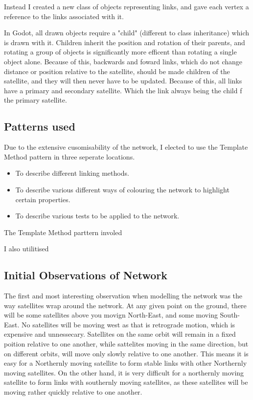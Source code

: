 \documentclass[12pt]{article}
\begin{document}
Instead I created a new class of objects representing links, and gave each vertex a reference to the links associated with it. 

In Godot, all drawn objects require a "child" (different to class inheritance) which is drawn with it. Children inherit the position and rotation of their parents, and rotating a group of objects is significantly more efficent than rotating a single object alone. Because of this, backwards and foward links, which do not change distance or position relative to the satellite, should be made children of the satellite, and they will then never have to be updated. Because of this, all links have a primary and secondary satellite. Which the link always being the child f the primary satellite.

\subsection{Patterns used}

Due to the extensive cusomisability of the network, I elected to use the Template Method pattern in three seperate locations.

\begin{itemize}
\item To describe different linking methods.
\item To describe various different ways of colouring the network to highlight certain properties.
\item To describe various tests to be applied to the network.
\end{itemize}

The Template Method parttern involed %

I also utilitised

\subsection{Initial Observations of Network}
The first and most interesting observation when modelling the network was the way satellites wrap around the network. At any given point on the ground, there will be some satellites above you movign North-East, and some moving South-East. No satellites will be moving west as that is retrograde motion, which is expensive and unnessecary. Satellites on the same orbit will remain in a fixed poition relative to one another,  while sattelites moving in the same direction, but on different orbits, will move only slowly relative to one another. This means it is easy for a Northernly moving satellite to form stable links with other Northernly moving satellites. On the other hand, it is very difficult for a northernly moving satellite to form links with southernly moving satellites, as these satellites will be moving rather quickly relative to one another.
\end{document}
